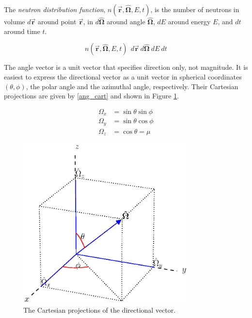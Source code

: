 The \emph{neutron distribution function}, $n(\boldsymbol{\vec{r}},\boldsymbol{\hat{\Omega}},E,t)$, 
is the number of neutrons in volume $d\boldsymbol{\vec{r}}$ around point $\boldsymbol{\vec{r}}$, in $d \boldsymbol{\hat{\Omega}}$ around angle $\boldsymbol{\hat{\Omega}}$, $dE$ around energy $E$, and $dt$ around time $t$. 

\begin{equation}
\label{NDF}
n(\boldsymbol{\vec{r}},\boldsymbol{\hat{\Omega}},E,t) \:\: d\boldsymbol{\vec{r}} \: d \boldsymbol{\hat{\Omega}} \: dE \: dt
\end{equation}

The angle vector is a unit vector that specifies direction only, not magnitude.  It is easiest to express the directional vector as a unit vector in spherical coordinates $(\theta, \phi)$, the polar angle and the azimuthal angle, respectively.  Their Cartesian projections are given by \eqref{ang_cart} and shown in Figure \ref{ang_relations}.

\begin{equation}
\label{ang_cart}
\begin{split}
\Omega_x &= \sin \theta \sin \phi  \\
\Omega_y &= \sin \theta \cos \phi \\
\Omega_z &= \cos \theta = \mu
\end{split}
\end{equation}

\begin{figure}[h!] 
  \centering
    \includegraphics[width=0.8\textwidth , trim= 0cm 2.5cm 0cm 0cm]{graphics/ang_relation.eps} %
     \caption{The Cartesian projections of the directional vector. \label{ang_relations}}
\end{figure}

